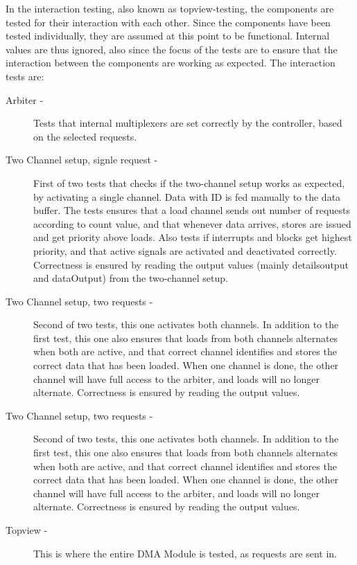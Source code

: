 \begin{appendix}
In the interaction testing, also known as topview-testing, the components are tested for their interaction with each other.
Since the components have been tested individually, they are assumed at this point to be functional. 
Internal values are thus ignored, also since the focus of the tests are to ensure that the interaction between the components are working as expected.
The interaction tests are:
\begin{description}
    \item[Arbiter -]
    Tests that internal multiplexers are set correctly by the controller, based on the selected requests.
    \item[Two Channel setup, signle request -]
    First of two tests that checks if the two-channel setup works as expected, by activating a single channel.
    Data with ID is fed manually to the data buffer.
    The tests ensures that a load channel sends out number of requests according to count value, and that whenever data arrives, stores are issued and get priority above loads.
    Also tests if interrupts and blocks get highest priority, and that active signals are activated and deactivated correctly.
    Correctness is ensured by reading the output values (mainly detailsoutput and dataOutput) from the two-channel setup.
    \item[Two Channel setup, two requests -]
    Second of two tests, this one activates both channels.
    In addition to the first test, this one also ensures that loads from both channels alternates when both are active, and that correct channel identifies and stores the correct data that has been loaded.
    When one channel is done, the other channel will have full access to the arbiter, and loads will no longer alternate.
    Correctness is ensured by reading the output values. 
    \item[Two Channel setup, two requests -]
    Second of two tests, this one activates both channels.
    In addition to the first test, this one also ensures that loads from both channels alternates when both are active, and that correct channel identifies and stores the correct data that has been loaded.
    When one channel is done, the other channel will have full access to the arbiter, and loads will no longer alternate.
    Correctness is ensured by reading the output values.
    \item[Topview -]
    This is where the entire DMA Module is tested, as requests are sent in.

\end{description}
\end{appendix}

